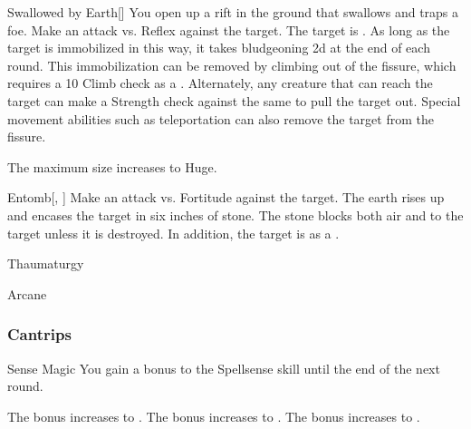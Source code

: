 \lowercase{\hypertarget{spell:Swallowed by Earth}{}}\label{spell:Swallowed by Earth}
\begin{freeability}[Rank 6]{\hypertarget{spell:Swallowed by Earth}{Swallowed by Earth}}[]
You open up a rift in the ground that swallows and traps a foe.
Make an attack vs. Reflex against the target.
\hit The target is .
As long as the target is immobilized in this way,
it takes bludgeoning  \minus2d at the end of each round.
This immobilization can be removed by climbing out of the fissure, which requires a  10 Climb check as a .
Alternately, any creature that can reach the target can make a Strength check against the same  to pull the target out.
Special movement abilities such as teleportation can also remove the target from the fissure.

\rankline
{} The maximum size increases to Huge.

\end{freeability}
\vspace{0.25em}



\lowercase{\hypertarget{spell:Entomb}{}}\label{spell:Entomb}
\begin{freeability}[Rank 8]{\hypertarget{spell:Entomb}{Entomb}}[, ]
Make an attack vs. Fortitude against the target.
\hit The earth rises up and encases the target in six inches of stone.
The stone blocks both air and  to the target unless it is destroyed.
In addition, the target is  as a .

\end{freeability}
\vspace{0.25em}


\newpage
\begin{spellsection}{Thaumaturgy}

\begin{spellheader}
\end{spellheader}


 Arcane

\subsubsection{Cantrips}


\begin{freeability}{Sense Magic}
You gain a  bonus to the Spellsense skill until the end of the next round.

\rankline
{} The bonus increases to .
 The bonus increases to .
 The bonus increases to .
\end{freeability}

\end{spellsection}


